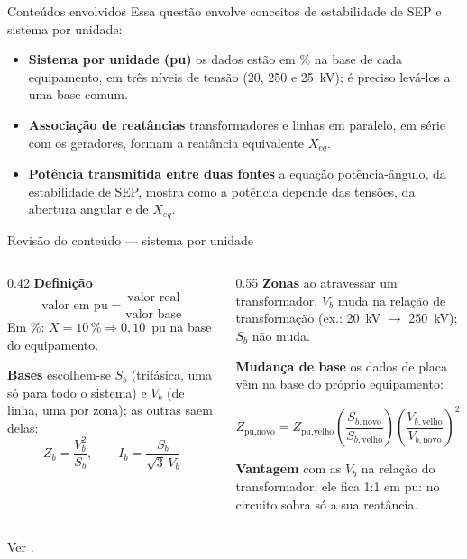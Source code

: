 \documentclass[aspectratio=169]{../../TemplateBeamerUFC/libs/ufc_format}
\newcommand{\passo}[1]{{\color{blue_theme}\bfseries #1}\enspace}
\begin{document}
\begin{frame}{Conteúdos envolvidos}
  Essa questão envolve conceitos de \alert{estabilidade de SEP} e
  \alert{sistema por unidade}:
  \begin{itemize}
    \item \passo{Sistema por unidade (pu)} os dados estão em \% na base de
          cada equipamento, em três níveis de tensão (20, 250 e 25~kV); é
          preciso levá-los a uma base comum.
    \item \passo{Associação de reatâncias} transformadores e linhas em
          paralelo, em série com os geradores, formam a reatância
          equivalente $X_{eq}$.
    \item \passo{Potência transmitida entre duas fontes} a equação
          potência-ângulo, da estabilidade de SEP, mostra como a potência
          depende das tensões, da abertura angular e de $X_{eq}$.
  \end{itemize}
\end{frame}

\begin{frame}{Revisão do conteúdo --- sistema por unidade}
  \small
  \begin{columns}[T]
    \begin{column}{0.42\textwidth}
      \passo{Definição}
      \[
        \text{valor em pu} = \frac{\text{valor real}}{\text{valor base}}
      \]
      Em \%: $X = 10\,\% \Rightarrow 0{,}10$~pu na base do equipamento.

      \vspace{0.6em}
      \passo{Bases} escolhem-se $S_b$ (trifásica, uma só para todo o
      sistema) e $V_b$ (de linha, uma por zona); as outras saem delas:
      \[
        Z_b = \frac{V_b^2}{S_b}, \qquad I_b = \frac{S_b}{\sqrt{3}\,V_b}
      \]
    \end{column}
    \begin{column}{0.55\textwidth}
      \pause
      \passo{Zonas} ao atravessar um transformador, $V_b$ muda na relação de
      transformação (ex.: 20~kV $\to$ 250~kV); $S_b$ não muda.

      \vspace{0.6em}\pause
      \passo{Mudança de base} os dados de placa vêm na base do próprio
      equipamento:
      \begin{conceito}[left=3pt,right=3pt]
        \centering
        $Z_{\text{pu,novo}} = Z_{\text{pu,velho}}
        \left(\dfrac{S_{b,\text{novo}}}{S_{b,\text{velho}}}\right)
        \left(\dfrac{V_{b,\text{velho}}}{V_{b,\text{novo}}}\right)^{2}$
      \end{conceito}
      \pause
      \passo{Vantagem} com as $V_b$ na relação do transformador, ele fica
      1:1 em pu: no circuito sobra só a sua reatância.
    \end{column}
  \end{columns}
  \vfill
  {\footnotesize\color{black!55} Ver \cite{stevenson1986elementos,bichels2018sep}.}
\end{frame}
\end{document}
